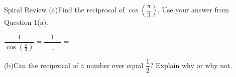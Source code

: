 \documentclass[10pt]{article}
\begin{document}
\begin{notesbox}{Spiral Review}
\vspace{4pt}
(a)\quad Find the reciprocal of $\cos\!\left(\dfrac{\pi}{3}\right)$.
  Use your answer from Question 1(a).

\vspace{4pt}
$\dfrac{1}{\cos\!\left(\frac{\pi}{3}\right)} = \dfrac{1}{\underline{\hspace{1cm}}} = $ \blank{1.8cm}

\vspace{4pt}
(b)\quad Can the reciprocal of a number ever equal $\dfrac{1}{2}$? Explain why or why not.

\vspace{4pt}
\writeline

\end{notesbox}
\end{document}
